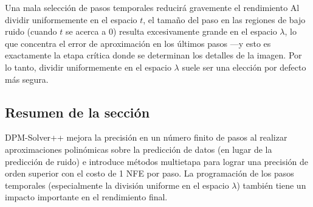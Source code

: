 \begin{warningbox}{Una mala selección de pasos temporales reducirá gravemente el rendimiento}
Al dividir uniformemente en el espacio $t$, el tamaño del paso en las regiones de bajo ruido (cuando $t$ se acerca a 0) resulta excesivamente grande en el espacio $\lambda$, lo que concentra el error de aproximación en los últimos pasos —y esto es exactamente la etapa crítica donde se determinan los detalles de la imagen. Por lo tanto, dividir uniformemente en el espacio $\lambda$ suele ser una elección por defecto más segura.
\end{warningbox}

\subsection{Resumen de la sección}

DPM-Solver++ mejora la precisión en un número finito de pasos al realizar aproximaciones polinómicas sobre la predicción de datos (en lugar de la predicción de ruido) e introduce métodos multietapa para lograr una precisión de orden superior con el costo de 1 NFE por paso. La programación de los pasos temporales (especialmente la división uniforme en el espacio $\lambda$) también tiene un impacto importante en el rendimiento final.
